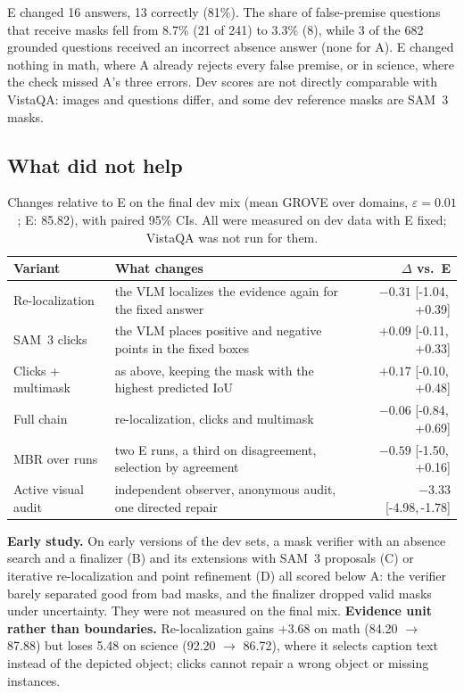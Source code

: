 \documentclass{article}
\newcommand{\ci}[2]{[#1,\,#2]}
\begin{document}
E changed 16 answers, 13 correctly (81\%).
The share of false-premise questions that receive masks fell from 8.7\% (21 of 241) to 3.3\% (8),
while 3 of the 682 grounded questions received an incorrect absence answer (none for A).
E changed nothing in math, where A already rejects every false premise, or in science, where the check missed A's three errors.
Dev scores are not directly comparable with VistaQA: images and questions differ, and some dev reference masks are SAM~3 masks.

\subsection{What did not help}
\label{sec:negative}

\begin{table}[t]
  \caption{Changes relative to E on the final dev mix (mean GROVE over domains, $\varepsilon=0.01$; E: 85.82), with paired 95\% CIs.
    All were measured on dev data with E fixed; VistaQA was not run for them.}
  \label{tab:negative}
  \centering
  \footnotesize
  \begin{tabularx}{\linewidth}{@{}lXr@{}}
    \toprule
    Variant & What changes & $\Delta$ vs.\ E \\
    \midrule
    Re-localization & the VLM localizes the evidence again for the fixed answer & $-0.31$ \ci{-1.04}{+0.39} \\
    SAM~3 clicks & the VLM places positive and negative points in the fixed boxes & $+0.09$ \ci{-0.11}{+0.33} \\
    Clicks + multimask & as above, keeping the mask with the highest predicted IoU & $+0.17$ \ci{-0.10}{+0.48} \\
    Full chain & re-localization, clicks and multimask & $-0.06$ \ci{-0.84}{+0.69} \\
    MBR over runs & two E runs, a third on disagreement, selection by agreement & $-0.59$ \ci{-1.50}{+0.16} \\
    Active visual audit & independent observer, anonymous audit, one directed repair & $-3.33$ \ci{-4.98}{-1.78} \\
    \bottomrule
  \end{tabularx}
\end{table}

\textbf{Early study.}
On early versions of the dev sets, a mask verifier with an absence search and a finalizer (B)
and its extensions with SAM~3 proposals (C) or iterative re-localization and point refinement (D) all scored below A:
the verifier barely separated good from bad masks, and the finalizer dropped valid masks under uncertainty.
They were not measured on the final mix.
\textbf{Evidence unit rather than boundaries.}
Re-localization gains $+3.68$ on math (84.20 $\rightarrow$ 87.88) but loses 5.48 on science (92.20 $\rightarrow$ 86.72),
where it selects caption text instead of the depicted object; clicks cannot repair a wrong object or missing instances.
\end{document}

